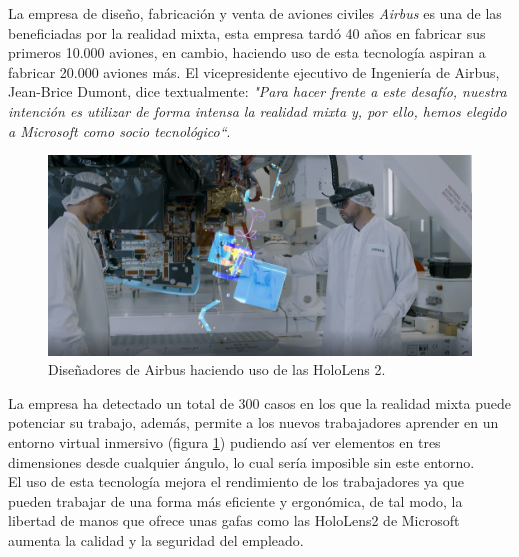 La empresa de diseño, fabricación y venta de aviones civiles \textit{Airbus} es una de las beneficiadas por la realidad mixta, esta empresa tardó 40 años en fabricar sus primeros 10.000 aviones, en cambio, haciendo uso de esta tecnología aspiran a fabricar 20.000 aviones más. El vicepresidente ejecutivo de Ingeniería de Airbus, Jean-Brice Dumont, dice textualmente: \textit{"Para hacer frente a este desafío, nuestra intención es utilizar de forma intensa la realidad mixta y, por ello, hemos elegido a Microsoft como socio tecnológico“}.


\begin{figure}[h]
    \centering
    \includegraphics[scale=0.3]{Images/Estado del arte/ingenierosAirbus.png}
    \caption{Diseñadores de Airbus haciendo uso de las HoloLens 2.}
    \label{fig:ingenierosAirbusHololens2}
\end{figure}



La empresa ha detectado un total de 300 casos en los que la realidad mixta puede potenciar su trabajo, además, permite a los nuevos trabajadores aprender en un entorno virtual inmersivo (figura \ref{fig:ingenierosAirbusHololens2}) pudiendo así ver elementos en tres dimensiones desde cualquier ángulo, lo cual sería imposible sin este entorno.\\



El uso de esta tecnología mejora el rendimiento de los trabajadores ya que pueden trabajar de una forma más eficiente y ergonómica, de tal modo, la libertad de manos que ofrece unas gafas como las HoloLens2 de Microsoft aumenta la calidad y la seguridad del empleado.